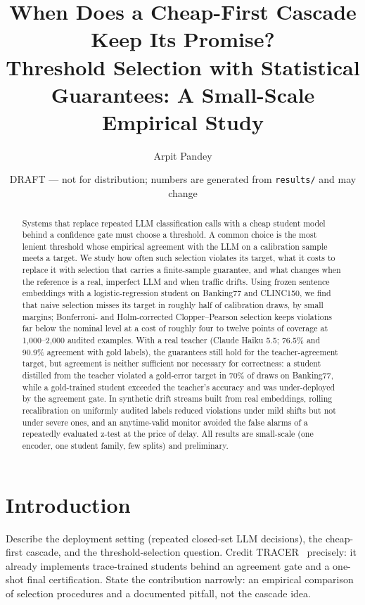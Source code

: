 \documentclass[11pt]{article}
\title{When Does a Cheap-First Cascade Keep Its Promise?\\
\large Threshold Selection with Statistical Guarantees: A Small-Scale Empirical Study}
\author{Arpit Pandey}
\date{DRAFT --- not for distribution; numbers are generated from \texttt{results/} and may change}
\begin{document}
\maketitle

\begin{abstract}
Systems that replace repeated LLM classification calls with a cheap student model behind a
confidence gate must choose a threshold. A common choice is the most lenient threshold whose
empirical agreement with the LLM on a calibration sample meets a target. We study how often such
selection violates its target, what it costs to replace it with selection that carries a
finite-sample guarantee, and what changes when the reference is a real, imperfect LLM and when
traffic drifts. Using frozen sentence embeddings with a logistic-regression student on Banking77
and CLINC150, we find that naive selection misses its target in roughly half of calibration draws,
by small margins; Bonferroni- and Holm-corrected Clopper--Pearson selection keeps violations far
below the nominal level at a cost of roughly four to twelve points of coverage at 1{,}000--2{,}000
audited examples. With a real teacher (Claude Haiku 5.5; 76.5\% and 90.9\% agreement with gold
labels), the guarantees still hold for the teacher-agreement target, but agreement is neither
sufficient nor necessary for correctness: a student distilled from the teacher violated a
gold-error target in 70\% of draws on Banking77, while a gold-trained student exceeded the teacher's
accuracy and was under-deployed by the agreement gate. In synthetic drift streams built from real
embeddings, rolling recalibration on uniformly audited labels reduced violations under mild shifts
but not under severe ones, and an anytime-valid monitor avoided the false alarms of a repeatedly
evaluated z-test at the price of delay. All results are small-scale (one encoder, one student
family, few splits) and preliminary.
\end{abstract}

\section{Introduction}
Describe the deployment setting (repeated closed-set LLM decisions), the cheap-first cascade, and
the threshold-selection question. Credit TRACER~\cite{rida2026tracer} precisely: it already
implements trace-trained students behind an agreement gate and a one-shot final certification.
State the contribution narrowly: an empirical comparison of selection procedures and a documented
pitfall, not the cascade idea.
\end{document}
